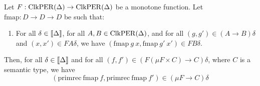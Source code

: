 \begin{lemma}\label{lem:primrec-well-typed}
  Let $F : \mathrm{ClkPER}(\Delta) \to \mathrm{ClkPER}(\Delta)$ be a monotone
  function.  Let $\mathrm{fmap} : D \to D \to D$ be such that:
  \begin{enumerate}
  \item For all $\delta \in \llbracket \Delta \rrbracket$, for all $A,B \in
    \mathrm{ClkPER}(\Delta)$, and for all $(g,g') \in (A \to B)\delta$ and
    $(x,x') \in FA\delta$, we have $(\mathrm{fmap}\ g\ x,
    \mathrm{fmap}\ g'\ x') \in FB\delta$.
  \end{enumerate}
  Then, for all $\delta \in \llbracket \Delta \rrbracket$ and for all $(f,f') \in
  (F(\mu F \times C) \to C)\delta$, where $C$ is a semantic type, we
  have
  \begin{displaymath}
    (\mathrm{primrec}\ \mathrm{fmap}\ f, \mathrm{primrec}\ \mathrm{fmap}\ f') \in (\mu F \to C)\delta
  \end{displaymath}
\end{lemma}

